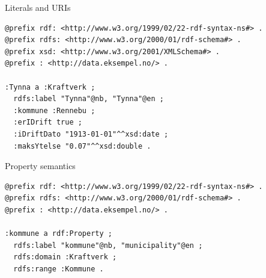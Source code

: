 \documentclass{dt}
\begin{document}
\begin{frame}[fragile]{Literals and URIs}
\begin{minipage}{0.65\textwidth}
\begin{code}[width=9.25cm]
\begin{verbatim}
@prefix rdf: <http://www.w3.org/1999/02/22-rdf-syntax-ns#> .
@prefix rdfs: <http://www.w3.org/2000/01/rdf-schema#> .
@prefix xsd: <http://www.w3.org/2001/XMLSchema#> .
@prefix : <http://data.eksempel.no/> .

:Tynna a :Kraftverk ;
  rdfs:label "Tynna"@nb, "Tynna"@en ;
  :kommune :Rennebu ;
  :erIDrift true ;
  :iDriftDato "1913-01-01"^^xsd:date ;
  :maksYtelse "0.07"^^xsd:double .
\end{verbatim}
\end{code}
\end{minipage}
\begin{minipage}{0.32\textwidth}
\end{minipage}

\end{frame}

\begin{frame}[fragile]{Property semantics}
\begin{code}
\begin{verbatim}
@prefix rdf: <http://www.w3.org/1999/02/22-rdf-syntax-ns#> .
@prefix rdfs: <http://www.w3.org/2000/01/rdf-schema#> .
@prefix : <http://data.eksempel.no/> .

:kommune a rdf:Property ;
  rdfs:label "kommune"@nb, "municipality"@en ;
  rdfs:domain :Kraftverk ;
  rdfs:range :Kommune .
\end{verbatim}
\end{code}
\end{frame}
\end{document}
